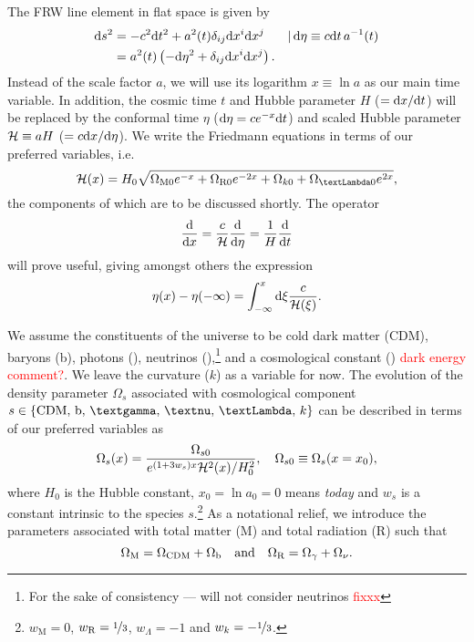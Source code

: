 The FRW line element in flat space is given by
\begin{equation}\label{sec1:theory:eq:FRW}
    \begin{split}
        \D s^2 &= -c^2\D t^2 + a^2(t) \delta_{ij} \D x^i \D x^j && |\, \D \eta \equiv c\D t\, a^{-1}(t) \\%
                &= a^2(t) \left( -\D \eta^2 + \delta_{ij} \D x^i \D x^j \right).
    \end{split}
\end{equation}
Instead of the scale factor $a$, we will use its logarithm $x\equiv\ln{a}$ as our main time variable. In addition, the cosmic time $t$ and Hubble parameter $H$ ($=\D x/\D t$) will be replaced by the conformal time $\eta$ ($\D \eta = ce^{-x}\D t$) and scaled Hubble parameter $\Hp\equiv aH$ ($=c\D x/\D \eta$). We write the Friedmann equations in terms of our preferred variables, i.e.
\begin{equation}\label{sec1:theory:eq:Hp_of_x}
    \Hp(x) = H_0 \sqrt{\OmgM e^{-x} + \OmgR e^{-2x}  + \Omgk + \OmgL e^{2x}},
\end{equation}
the components of which are to be discussed shortly. The operator 
\begin{equation}
    \frac{\D}{\D x} = \frac{c}{\Hp} \frac{\D}{\D \eta} = \frac{1}{H} \frac{\D}{\D t}
\end{equation}
will prove useful, giving amongst others the expression
\begin{equation}\label{sec1:theory:eq:eta_of_x}
    \eta(x) - \eta(-\infty)= \int_{-\infty}^{x}\D \xi \frac{c}{\Hp(\xi)}.
\end{equation}



We assume the constituents of the universe to be cold dark matter (CDM), baryons (b), photons (\textgamma), neutrinos (\textnu),\footnote{For the sake of consistency --- will not consider neutrinos \textcolor{red}{fixxx}} and a cosmological constant (\textLambda) \textcolor{red}{dark energy comment?}. We leave the curvature ($k$) as a variable for now. The evolution of the density parameter $\Omega_{s}$ associated with cosmological component $s \in \left\{ \mathrm{CDM},\, \mathrm{b},\, \text{\textgamma},\, \text{\textnu},\, \text{\textLambda},\, k \right\}$ can be described in terms of our preferred variables as
\begin{equation}\label{sec1:theory:eq:evolution_density_param}
    \Omega_s(x) = \frac{\Omega_{s0}}{e^{(1+3w_s)x} \Hp^2(x)/H_0^2},\quad \Omega_{s0} \equiv \Omega_{s}(x=x_0),
\end{equation}
where $H_0$ is the Hubble constant, $x_0=\ln{a_0}=0$ means \textit{today} and $w_s$ is a constant intrinsic to the species $s$.\footnote{$w_\mathrm{M}=0$, $w_\mathrm{R}=\nicefrac{1}{3}$, $w_\Lambda=-1$ and $w_k=-\nicefrac{1}{3}$.} As a notational relief, we introduce the parameters associated with total matter (M) and total radiation (R) such that
\begin{equation}\label{sec1:theory:eq:density_params_totals}
    \OmgM[] = \Omega_{\mathrm{CDM}} + \Omega_{\mathrm{b}} \quad \mathrm{and} 
        \quad \OmgR[]= \Omega_{\gamma } + \Omega_{\nu }.
\end{equation}

